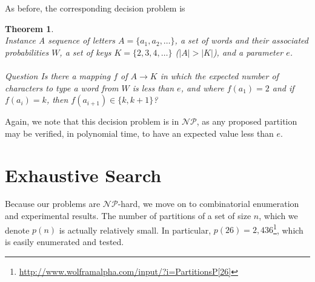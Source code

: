 \documentclass{article}
\newcommand{\NP}{\ensuremath{\mathcal{NP}}}
\newtheorem{theorem}{Theorem}
\begin{document}
As before, the corresponding decision problem is
\begin{theorem}~\\
{\sc Instance} A sequence of letters $A = \{a_1, a_2, \ldots \}$, a set of words and their associated probabilities $W$, a set of keys $K = \{2, 3, 4, \ldots \}$ ($|A| > |K|$), and a parameter $e$.\\
~\\
{\sc Question} Is there a mapping $f$ of $A \to K$ in which the expected number of characters to type a word from $W$ is less than $e$, and where $f(a_1) = 2$ and if $f(a_i) = k$, then $f(a_{i+1}) \in \{k, k+1\}$?
\end{theorem}

Again, we note that this decision problem is in \NP, as any proposed partition may be verified, in polynomial time, to have an expected value less than $e$.

\section{Exhaustive Search}

Because our problems are \NP-hard, we move on to combinatorial enumeration and experimental results.  The number of partitions of a set of size $n$, which we denote $p(n)$ is actually relatively small.  In particular, $p(26) = 2,436$\footnote{\url{http://www.wolframalpha.com/input/?i=PartitionsP[26]}}, which is easily enumerated and tested.
\end{document}
